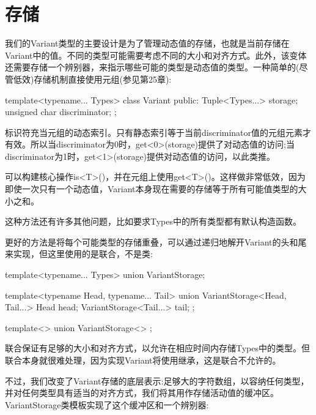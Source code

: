 \section{存储}
我们的Variant类型的主要设计是为了管理动态值的存储，也就是当前存储在Variant中的值。不同的类型可能需要考虑不同的大小和对齐方式。此外，该变体还需要存储一个辨别器，来指示哪些可能的类型是动态值的类型。一种简单的(尽管低效)存储机制直接使用元组(参见第25章):

\begin{cpp}
template<typename... Types>
class Variant {
	public:
	Tuple<Types...> storage;
	unsigned char discriminator;
};
\end{cpp}

标识符充当元组的动态索引。只有静态索引等于当前discriminator值的元组元素才有效。所以当discriminator为0时，get<0>(storage)提供了对动态值的访问;当discriminator为1时，get<1>(storage)提供对动态值的访问，以此类推。

可以构建核心操作is<T>()，并在元组上使用get<T>()。这样做非常低效，因为即使一次只有一个动态值，Variant本身现在需要的存储等于所有可能值类型的大小之和。

\begin{notice}
这种方法还有许多其他问题，比如要求Types中的所有类型都有默认构造函数。
\end{notice}

更好的方法是将每个可能类型的存储重叠，可以通过递归地解开Variant的头和尾来实现，但这里使用的是联合，不是类:

\begin{cpp}
template<typename... Types>
union VariantStorage;

template<typename Head, typename... Tail>
union VariantStorage<Head, Tail...> {
	Head head;
	VariantStorage<Tail...> tail;
};

template<>
union VariantStorage<> {
};
\end{cpp}

联合保证有足够的大小和对齐方式，以允许在相应时间内存储Types中的类型。但联合本身就很难处理，因为实现Variant将使用继承，这是联合不允许的。

不过，我们改变了Variant存储的底层表示:足够大的字符数组，以容纳任何类型，并对任何类型具有适当的对齐方式，我们将其用作存储活动值的缓冲区。VariantStorage类模板实现了这个缓冲区和一个辨别器:

